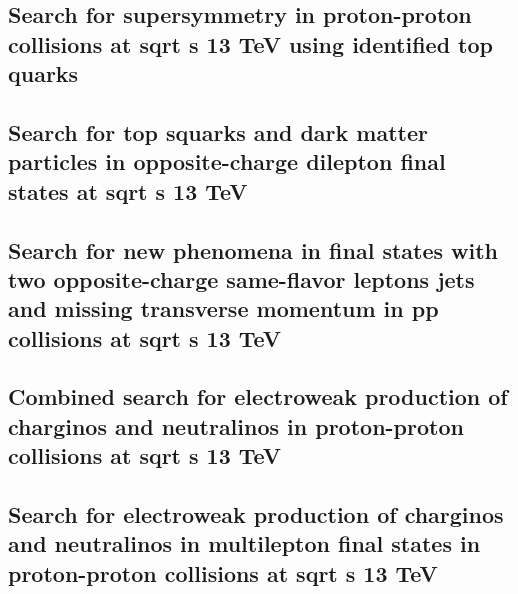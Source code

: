 \documentclass[a4paper, 11pt, twoside, openright]{report}
\begin{document}
\subsection{Search for supersymmetry in proton-proton collisions at sqrt s 13 TeV using identified top quarks}


\subsection{Search for top squarks and dark matter particles in opposite-charge dilepton final states at sqrt s 13 TeV}


\subsection{Search for new phenomena in final states with two opposite-charge same-flavor leptons jets and missing transverse momentum in pp collisions at sqrt s 13 TeV}


\subsection{Combined search for electroweak production of charginos and neutralinos in proton-proton collisions at sqrt s 13 TeV}


\subsection{Search for electroweak production of charginos and neutralinos in multilepton final states in proton-proton collisions at sqrt s 13 TeV}

\end{document}
